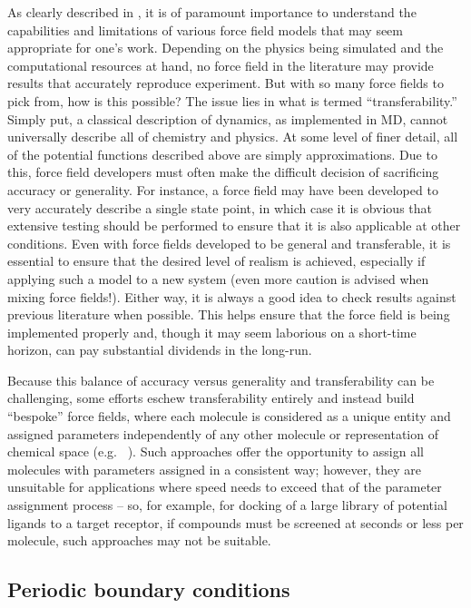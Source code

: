 \documentclass[9pt,bestpractices]{livecoms}
\begin{document}
As clearly described in \citet{Becker2013}, it is of paramount importance to understand the capabilities and limitations of various force field models that may seem appropriate for one's work. 
Depending on the physics being simulated and the computational resources at hand, no force field in the literature may provide results that accurately reproduce experiment.
But with so many force fields to pick from, how is this possible?
The issue lies in what is termed ``transferability.'' 
Simply put, a classical description of dynamics, as implemented in MD, cannot universally describe all of chemistry and physics. 
At some level of finer detail, all of the potential functions described above are simply approximations.
Due to this, force field developers must often make the difficult decision of sacrificing accuracy or generality. 
For instance, a force field may have been developed to very accurately describe a single state point, in which case it is obvious that extensive testing should be performed to ensure that it is also applicable at other conditions.
Even with force fields developed to be general and transferable, it is essential to ensure that the desired level of realism is achieved, especially if applying such a model to a new system (even more caution is advised when mixing force fields!).
Either way, it is always a good idea to check results against previous literature when possible.
This helps ensure that the force field is being implemented properly and, though it may seem laborious on a short-time horizon, can pay substantial dividends in the long-run.

Because this balance of accuracy versus generality and transferability can be challenging, some efforts eschew transferability entirely and instead build ``bespoke'' force fields, where each molecule is considered as a unique entity and assigned parameters independently of any other molecule or representation of chemical space (e.g. ~\cite{Dupradeau:2010:Phys.Chem.Chem.Phys.}).
Such approaches offer the opportunity to assign all molecules with parameters assigned in a consistent way; however, they are unsuitable for applications where speed needs to exceed that of the parameter assignment process -- so, for example, for docking of a large library of potential ligands to a target receptor, if compounds must be screened at seconds or less per molecule, such approaches may not be suitable.


\subsection{Periodic boundary conditions}
\label{sec:periodic}
\end{document}

